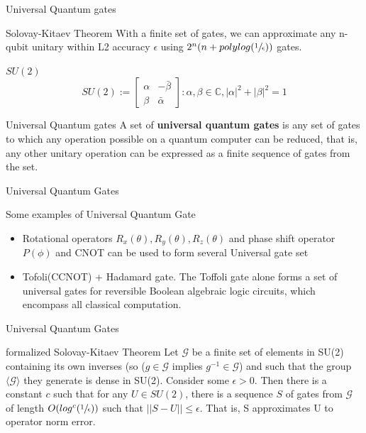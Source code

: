     \begin{frame}{Universal Quantum gates}
        \begin{block}{Solovay-Kitaev Theorem}
            With a finite set of gates, we can approximate any n-qubit unitary within L2 accuracy $\epsilon$
            using $2^n(n+polylog(\sfrac{1}{\epsilon}))$ gates.
        \end{block}
        \pause
        \begin{block}{$SU(2)$}
            $$SU(2) := \begin{bmatrix}
                \alpha & -\bar{\beta} \\
                \beta & \bar{\alpha}
            \end{bmatrix}
            : \alpha, \beta \in \mathbb{C}, |\alpha|^2 + |\beta|^2 = 1$$
        \end{block}
        \begin{block}{Universal Quantum gates}
            A set of \textbf{universal quantum gates} is any set of gates to which any operation possible on a quantum computer can be reduced, that is, any other unitary operation can be expressed as a finite sequence of gates from the set. 
        \end{block}
    \end{frame}
    \begin{frame}{Universal Quantum Gates}
        \begin{exampleblock}{Some examples of Universal Quantum Gate}
            \begin{itemize}
                \item Rotational operators $R_x(\theta),R_y(\theta),R_z(\theta)$
                and phase shift operator $P(\phi)$ and CNOT can be used to form several Universal gate set
                \item Tofoli(CCNOT) + Hadamard gate. 
                The Toffoli gate alone forms a set of universal gates for 
                reversible Boolean algebraic logic circuits, which encompass all 
                classical computation.
            \end{itemize}
        \end{exampleblock}
    \end{frame}
    \begin{frame}{Universal Quantum Gates}
        \begin{block}{formalized Solovay-Kitaev Theorem}
            Let $\mathcal{G}$ be a finite set of elements in SU(2) containing its own inverses (so 
    ($g \in \mathcal{G}$ implies $g^{-1} \in \mathcal{G}$)
        and such that the group $\langle \mathcal{G} \rangle$ they generate is dense in SU(2). Consider some 
    $\epsilon > 0$. Then there is a constant $c$ such that for any 
        $U \in SU(2)$, there is a sequence $S$ of gates from $\mathcal {G}$ of length 
    $O(log^c(\sfrac{1}{\epsilon}))$ such that $||S-U|| \leq \epsilon$. That is, 
S approximates U to operator norm error.
        \end{block}
    \end{frame}
